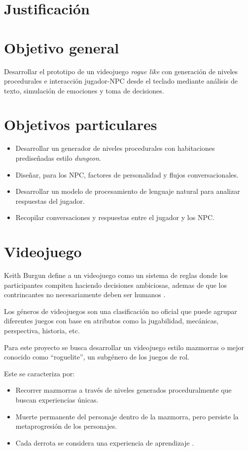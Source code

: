 \documentclass[12pt,twoside]{article}
\begin{document}
	\clearpage
	\section{Justificación}
	
	
	
	\clearpage
	\section{Objetivo general}
	Desarrollar el prototipo de un videojuego \textit{rogue like} con generación de niveles procedurales e interacción jugador-NPC desde el teclado mediante análisis de texto, simulación de emociones y toma de decisiones.
	
	\section{Objetivos particulares}
	
	\begin{itemize}[noitemsep]
		\item Desarrollar un generador de niveles procedurales con habitaciones prediseñadas estilo \textit{dungeon}.
		\item Diseñar, para los NPC, factores de personalidad y flujos conversacionales.
		\item Desarrollar  un modelo  de procesamiento de lenguaje natural para analizar respuestas del jugador.
		\item Recopilar conversaciones y respuestas entre el jugador y los NPC.
	\end{itemize}
	
	\clearpage
	\section{Videojuego}
	
	Keith Burgun define a un videojuego como un sistema de reglas donde los participantes compiten haciendo decisiones ambiciosas, ademas de que los contrincantes no necesariamente deben ser humanos \cite{info: videojuego1}.
	
	Los géneros  de videojuegos son una clasificación no oficial que puede agrupar diferentes juegos con base en atributos como la jugabilidad, mecánicas, perspectiva, historia, etc. 
	
	Para este proyecto se busca desarrollar un videojuego estilo mazmorras o mejor conocido como ``roguelite'', un subgénero de los juegos de rol.
	
	Este se caracteriza por: 
	\begin{itemize}[noitemsep]
		\item Recorrer mazmorras a través de niveles generados proceduralmente que buscan experiencias únicas. 
		\item Muerte permanente del personaje dentro de la mazmorra, pero persiste la metaprogresión de los personajes.
		\item Cada derrota se considera una experiencia de aprendizaje \cite{info: videojuego2}.
	\end{itemize}
	
\end{document}
